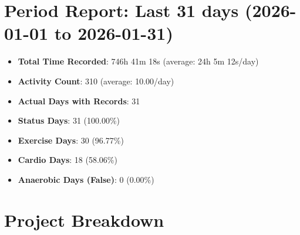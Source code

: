 \documentclass[12pt]{extarticle}
\begin{document}
{\fontsize{18}{21.6}\selectfont\section*{Period Report: Last 31 days (2026-01-01 to 2026-01-31)}}

\begin{itemize}[topsep=0pt, itemsep=-0.5ex]
    \item \textbf{Total Time Recorded}: 746h 41m 18s (average: 24h 5m 12s/day)
    \item \textbf{Activity Count}: 310 (average: 10.00/day)
    \item \textbf{Actual Days with Records}: 31
    \item \textbf{Status Days}: 31 (100.00\%)
    \item \textbf{Exercise Days}: 30 (96.77\%)
    \item \textbf{Cardio Days}: 18 (58.06\%)
    \item \textbf{Anaerobic Days (False)}: 0 (0.00\%)
\end{itemize}

{\fontsize{16}{19.2}\selectfont\section*{Project Breakdown}}
\end{document}
